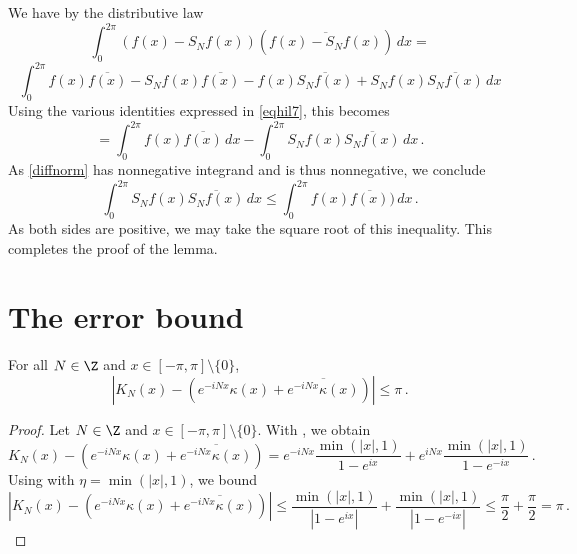 We have by the distributive law
\begin{equation}\label{diffnorm}
    \int_0^{2\pi} (f(x)-S_Nf(x))(\overline{f(x)-S_Nf(x)})\, dx=
\end{equation}
\begin{equation*}
 \int_0^{2\pi} f(x)\overline{f(x)}
    -S_Nf(x)\overline{f(x)}
   -f(x)\overline{S_Nf(x)}
     + S_Nf(x)\overline{S_Nf(x)}\, dx
\end{equation*}
Using the various identities expressed in \eqref{eqhil7}, this becomes
\begin{equation}
 =\int_0^{2\pi} f(x)\overline{f(x)}\, dx
    -
   \int_0^{2\pi} S_Nf(x)\overline{S_Nf(x)}\, dx\, .
\end{equation}
As \eqref{diffnorm} has nonnegative integrand and is thus nonnegative, we conclude
\begin{equation}
  \int_0^{2\pi} S_Nf(x)\overline{S_Nf(x)}\, dx\le
 \int_0^{2\pi} f(x)\overline{f(x)})\, dx\, .
\end{equation}
As both sides are positive, we may take the square root of this inequality.
This completes the proof of the lemma.





\section{The error bound}
\label{10difference}

\begin{lemma}
    \label{Dirichlet-Hilbert}
    \leanok
    For all $N\in\Z$ and $x\in [-\pi,\pi] \setminus \{0\}$,
    \begin{equation*}
        \left|K_N(x) - (e^{-iNx}\kappa(x) + \overline{e^{-iNx}\kappa(x)})\right| \le \pi \,.
    \end{equation*}
\end{lemma}

\begin{proof}
    \leanok
    Let $N\in\Z$ and $x\in [-\pi,\pi] \setminus \{0\}$. With , we obtain
    \begin{equation*}
        K_N(x) - (e^{-iNx}\kappa(x) + \overline{e^{-iNx}\kappa(x)})
        = e^{-iNx} \frac{\min(|x|, 1) }{1 - e^{ix}} + e^{iNx} \frac{\min(|x|, 1) }{1 - e^{-ix}} \,.
    \end{equation*}
    Using  with $\eta = \min(|x|, 1)$, we bound
    \begin{equation*}
        \left|K_N(x) - (e^{-iNx}\kappa(x) + \overline{e^{-iNx}\kappa(x)})\right|
        \le \frac{\min(|x|, 1) }{|1 - e^{ix}|} + \frac{\min(|x|, 1)}{|1 - e^{-ix}|}
        \le \frac{\pi}{2} + \frac{\pi}{2} = \pi \,.
    \end{equation*}
\end{proof}

